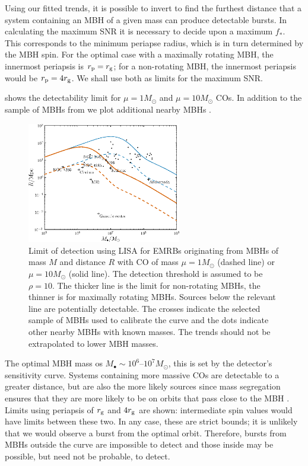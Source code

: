 Using our fitted trends, it is possible to invert  to find the furthest distance that a system containing an MBH of a given mass can produce detectable bursts. In calculating the maximum SNR it is necessary to decide upon a maximum $f_\ast$. This corresponds to the minimum periapse radius, which is in turn determined by the MBH spin. For the optimal case with a maximally rotating MBH, the innermost periapsis is $r_\mathrm{p} = r_\mathrm{g}$; for a non-rotating MBH, the innermost periapsis would be $r_\mathrm{p} = 4r_\mathrm{g}$. We shall use both as limits for the maximum SNR.

 shows the detectability limit for $\mu = 1 M_\odot$ and $\mu = 10 M_\odot$ COs. In addition to the sample of MBHs from  we plot additional nearby MBHs \citep[see][and references therein]{Graham2008,Graham2011,Graham2013}. 
\begin{figure}
\centering
 \includegraphics[width=0.6\textwidth]{./images/Fig_M_R_detect_1}
 \caption{Limit of detection using LISA for EMRBs originating from MBHs of mass $M$ and distance $R$ with CO of mass $\mu = 1 M_\odot$ (dashed line) or $\mu = 10 M_\odot$ (solid line). The detection threshold is assumed to be $\rho = 10$. The thicker line is the limit for non-rotating MBHs, the thinner is for maximally rotating MBHs. Sources below the relevant line are potentially detectable. The crosses indicate the selected sample of MBHs used to calibrate the curve and the dots indicate other nearby MBHs with known masses. The trends should not be extrapolated to lower MBH masses.}
 \label{fig:detect}
\end{figure}
The optimal MBH mass os $M_\bullet \sim 10^6$--$10^7 M_\odot$, this is set by the detector's sensitivity curve. Systems containing more massive COs are detectable to a greater distance, but are also the more likely sources since mass segregation ensures that they are more likely to be on orbits that pass close to the MBH \citep{Bahcall1977, Alexander2009, Preto2010}. Limits using periapsis of $r_\mathrm{g}$ and $4r_\mathrm{g}$ are shown: intermediate spin values would have limits between these two. In any case, these are strict bounds; it is unlikely that we would observe a burst from the optimal orbit. Therefore, bursts from MBHs outside the curve are impossible to detect and those inside may be possible, but need not be probable, to detect.

